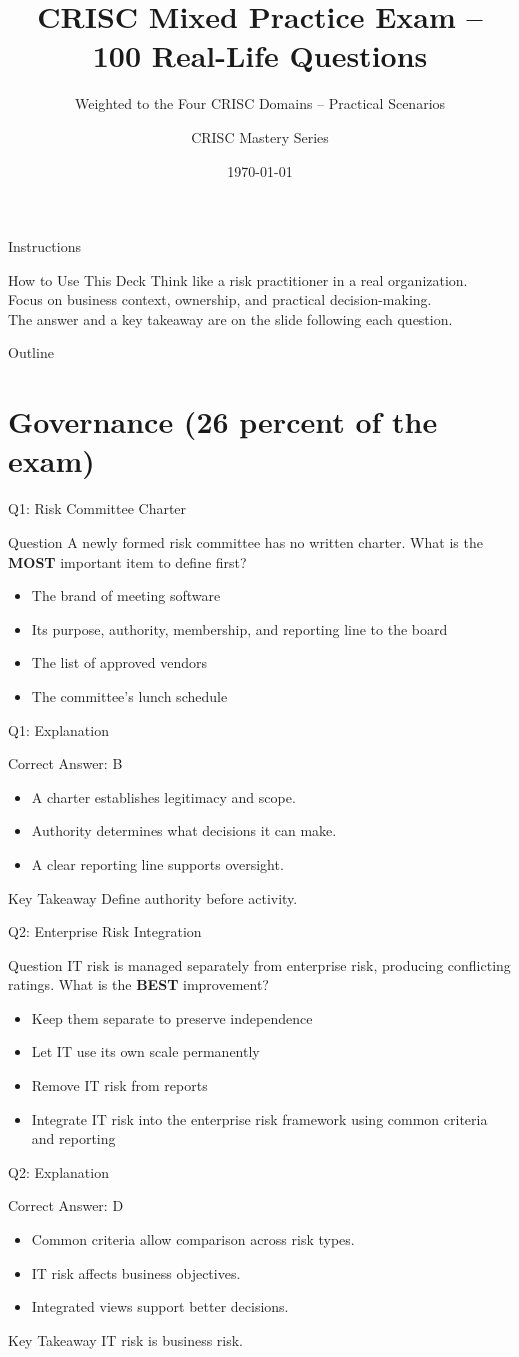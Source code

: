 \documentclass[aspectratio=169]{beamer}
\title{CRISC Mixed Practice Exam -- 100 Real-Life Questions}
\subtitle{Weighted to the Four CRISC Domains -- Practical Scenarios}
\author{CRISC Mastery Series}
\date{\today}
\newcommand{\hq}[7]{%
	\begin{frame}{Q#1: #2}
		\begin{block}{Question}
			#3
		\end{block}
		\begin{itemize}
			#4
		\end{itemize}
	\end{frame}
	\begin{frame}{Q#1: Explanation}
		\begin{block}{Correct Answer: #5}
			\begin{itemize}
				#6
			\end{itemize}
		\end{block}
		\begin{alertblock}{Key Takeaway}
			#7
		\end{alertblock}
	\end{frame}
}
\begin{document}
	
	\begin{frame}
		\titlepage
	\end{frame}
	
	\begin{frame}{Instructions}
		\begin{alertblock}{How to Use This Deck}
			Think like a risk practitioner in a real organization.\\
			Focus on business context, ownership, and practical decision-making.\\
			The answer and a key takeaway are on the slide following each question.
		\end{alertblock}
	\end{frame}
	
	\begin{frame}{Outline}
		\tableofcontents
	\end{frame}
	
	\section{Governance (26 percent of the exam)}
	
	\hq{1}{Risk Committee Charter}
	{A newly formed risk committee has no written charter. What is the \textbf{MOST} important item to define first?}
	{\item[\textbf{(A)}] The brand of meeting software
		\item[\textbf{(B)}] Its purpose, authority, membership, and reporting line to the board
		\item[\textbf{(C)}] The list of approved vendors
		\item[\textbf{(D)}] The committee's lunch schedule}
	{B}
	{\item A charter establishes legitimacy and scope.
		\item Authority determines what decisions it can make.
		\item A clear reporting line supports oversight.}
	{Define authority before activity.}
	
	\hq{2}{Enterprise Risk Integration}
	{IT risk is managed separately from enterprise risk, producing conflicting ratings. What is the \textbf{BEST} improvement?}
	{\item[\textbf{(A)}] Keep them separate to preserve independence
		\item[\textbf{(B)}] Let IT use its own scale permanently
		\item[\textbf{(C)}] Remove IT risk from reports
		\item[\textbf{(D)}] Integrate IT risk into the enterprise risk framework using common criteria and reporting}
	{D}
	{\item Common criteria allow comparison across risk types.
		\item IT risk affects business objectives.
		\item Integrated views support better decisions.}
	{IT risk is business risk.}
	
\end{document}

